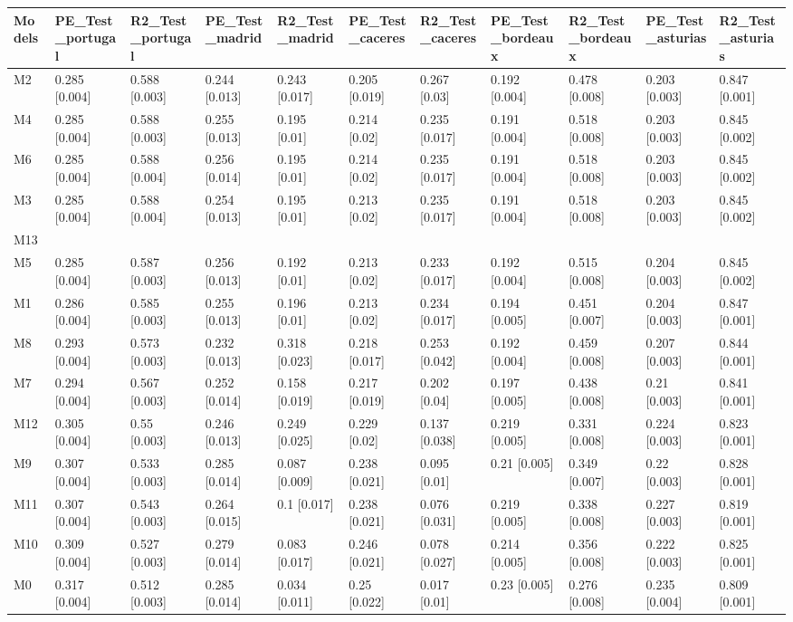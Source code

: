 \begin{table}[ht]
\centering
\begin{tabular}{lllllllllll}
  \hline
Models & PE\_Test\_portugal & R2\_Test\_portugal & PE\_Test\_madrid & R2\_Test\_madrid & PE\_Test\_caceres & R2\_Test\_caceres & PE\_Test\_bordeaux & R2\_Test\_bordeaux & PE\_Test\_asturias & R2\_Test\_asturias \\ 
  \hline
M2 & 0.285 [0.004] & 0.588 [0.003] & 0.244 [0.013] & 0.243 [0.017] & 0.205 [0.019] & 0.267 [0.03] & 0.192 [0.004] & 0.478 [0.008] & 0.203 [0.003] & 0.847 [0.001] \\ 
  M4 & 0.285 [0.004] & 0.588 [0.003] & 0.255 [0.013] & 0.195 [0.01] & 0.214 [0.02] & 0.235 [0.017] & 0.191 [0.004] & 0.518 [0.008] & 0.203 [0.003] & 0.845 [0.002] \\ 
  M6 & 0.285 [0.004] & 0.588 [0.004] & 0.256 [0.014] & 0.195 [0.01] & 0.214 [0.02] & 0.235 [0.017] & 0.191 [0.004] & 0.518 [0.008] & 0.203 [0.003] & 0.845 [0.002] \\ 
  M3 & 0.285 [0.004] & 0.588 [0.004] & 0.254 [0.013] & 0.195 [0.01] & 0.213 [0.02] & 0.235 [0.017] & 0.191 [0.004] & 0.518 [0.008] & 0.203 [0.003] & 0.845 [0.002] \\ 
  M13 &  &  &  &  &  &  &  &  &  &  \\ 
  M5 & 0.285 [0.004] & 0.587 [0.003] & 0.256 [0.013] & 0.192 [0.01] & 0.213 [0.02] & 0.233 [0.017] & 0.192 [0.004] & 0.515 [0.008] & 0.204 [0.003] & 0.845 [0.002] \\ 
  M1 & 0.286 [0.004] & 0.585 [0.003] & 0.255 [0.013] & 0.196 [0.01] & 0.213 [0.02] & 0.234 [0.017] & 0.194 [0.005] & 0.451 [0.007] & 0.204 [0.003] & 0.847 [0.001] \\ 
  M8 & 0.293 [0.004] & 0.573 [0.003] & 0.232 [0.013] & 0.318 [0.023] & 0.218 [0.017] & 0.253 [0.042] & 0.192 [0.004] & 0.459 [0.008] & 0.207 [0.003] & 0.844 [0.001] \\ 
  M7 & 0.294 [0.004] & 0.567 [0.003] & 0.252 [0.014] & 0.158 [0.019] & 0.217 [0.019] & 0.202 [0.04] & 0.197 [0.005] & 0.438 [0.008] & 0.21 [0.003] & 0.841 [0.001] \\ 
  M12 & 0.305 [0.004] & 0.55 [0.003] & 0.246 [0.013] & 0.249 [0.025] & 0.229 [0.02] & 0.137 [0.038] & 0.219 [0.005] & 0.331 [0.008] & 0.224 [0.003] & 0.823 [0.001] \\ 
  M9 & 0.307 [0.004] & 0.533 [0.003] & 0.285 [0.014] & 0.087 [0.009] & 0.238 [0.021] & 0.095 [0.01] & 0.21 [0.005] & 0.349 [0.007] & 0.22 [0.003] & 0.828 [0.001] \\ 
  M11 & 0.307 [0.004] & 0.543 [0.003] & 0.264 [0.015] & 0.1 [0.017] & 0.238 [0.021] & 0.076 [0.031] & 0.219 [0.005] & 0.338 [0.008] & 0.227 [0.003] & 0.819 [0.001] \\ 
  M10 & 0.309 [0.004] & 0.527 [0.003] & 0.279 [0.014] & 0.083 [0.017] & 0.246 [0.021] & 0.078 [0.027] & 0.214 [0.005] & 0.356 [0.008] & 0.222 [0.003] & 0.825 [0.001] \\ 
  M0 & 0.317 [0.004] & 0.512 [0.003] & 0.285 [0.014] & 0.034 [0.011] & 0.25 [0.022] & 0.017 [0.01] & 0.23 [0.005] & 0.276 [0.008] & 0.235 [0.004] & 0.809 [0.001] \\ 
   \hline
\end{tabular}
\end{table}
